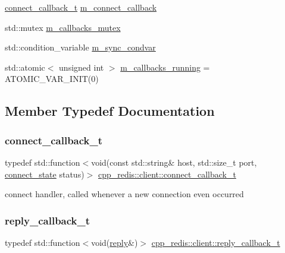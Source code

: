 \begin{DoxyCompactItemize}
\item 
\hyperlink{classcpp__redis_1_1client_a4bb592b64ededde5a6fcf8111ca2548f}{connect\+\_\+callback\+\_\+t} \hyperlink{classcpp__redis_1_1client_a687926859443c50e47289a4f07d7aaa3}{m\+\_\+connect\+\_\+callback}
\item 
std\+::mutex \hyperlink{classcpp__redis_1_1client_ade039dd0ae2e1e6d1aa3c1c0e6f6fedd}{m\+\_\+callbacks\+\_\+mutex}
\item 
std\+::condition\+\_\+variable \hyperlink{classcpp__redis_1_1client_a3dcead667f0e7a23766fbd35bcf8cfc2}{m\+\_\+sync\+\_\+condvar}
\item 
std\+::atomic$<$ unsigned int $>$ \hyperlink{classcpp__redis_1_1client_aa9737d2eebc3a80c26f2bee3fa1a4108}{m\+\_\+callbacks\+\_\+running} = A\+T\+O\+M\+I\+C\+\_\+\+V\+A\+R\+\_\+\+I\+N\+IT(0)
\end{DoxyCompactItemize}


\subsection{Member Typedef Documentation}
\mbox{\label{classcpp__redis_1_1client_a4bb592b64ededde5a6fcf8111ca2548f}} 
\subsubsection{\texorpdfstring{connect\+\_\+callback\+\_\+t}{connect\_callback\_t}}
{\footnotesize\ttfamily typedef std\+::function$<$void(const std\+::string\& host, std\+::size\+\_\+t port, \hyperlink{classcpp__redis_1_1client_a2512bd48dd45391249a69bd720c1e4da}{connect\+\_\+state} status)$>$ \hyperlink{classcpp__redis_1_1client_a4bb592b64ededde5a6fcf8111ca2548f}{cpp\+\_\+redis\+::client\+::connect\+\_\+callback\+\_\+t}}

connect handler, called whenever a new connection even occurred \mbox{\label{classcpp__redis_1_1client_a061a1140d36d2eaeda82b09a0bb3f9f2}} 
\subsubsection{\texorpdfstring{reply\+\_\+callback\+\_\+t}{reply\_callback\_t}}
{\footnotesize\ttfamily typedef std\+::function$<$void(\hyperlink{classcpp__redis_1_1reply}{reply}\&)$>$ \hyperlink{classcpp__redis_1_1client_a061a1140d36d2eaeda82b09a0bb3f9f2}{cpp\+\_\+redis\+::client\+::reply\+\_\+callback\+\_\+t}}

